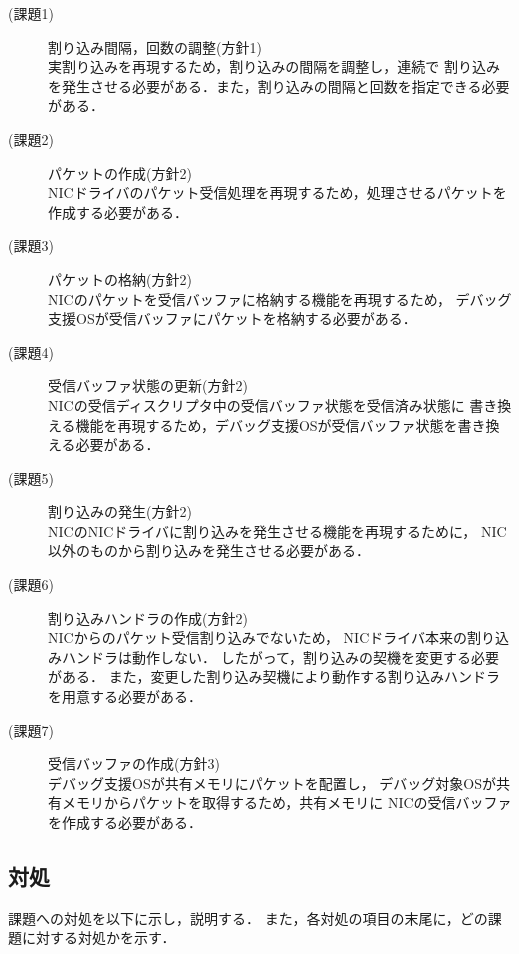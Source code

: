 \documentclass[submit,techreq,noauthor,dvipdfmx]{ipsj}
\begin{document}
\begin{description}
    \item[(課題1)] 割り込み間隔，回数の調整(方針1)\\
        実割り込みを再現するため，割り込みの間隔を調整し，連続で
        割り込みを発生させる必要がある．また，割り込みの間隔と回数を指定できる必要がある．
    \item[(課題2)] パケットの作成(方針2)\\
        NICドライバのパケット受信処理を再現するため，処理させるパケットを
        作成する必要がある．
    \item[(課題3)] パケットの格納(方針2)\\
        NICのパケットを受信バッファに格納する機能を再現するため，
        デバッグ支援OSが受信バッファにパケットを格納する必要がある．
    \item[(課題4)] 受信バッファ状態の更新(方針2)\\
        NICの受信ディスクリプタ中の受信バッファ状態を受信済み状態に
        書き換える機能を再現するため，デバッグ支援OSが受信バッファ状態を書き換える必要がある．
    \item[(課題5)] 割り込みの発生(方針2)\\
        NICのNICドライバに割り込みを発生させる機能を再現するために，
        NIC以外のものから割り込みを発生させる必要がある．
    \item[(課題6)] 割り込みハンドラの作成(方針2)\\
        NICからのパケット受信割り込みでないため，
        NICドライバ本来の割り込みハンドラは動作しない．
        したがって，割り込みの契機を変更する必要がある．
        また，変更した割り込み契機により動作する割り込みハンドラを用意する必要がある．
    \item[(課題7)] 受信バッファの作成(方針3)\\
        デバッグ支援OSが共有メモリにパケットを配置し，
        デバッグ対象OSが共有メモリからパケットを取得するため，共有メモリに
        NICの受信バッファを作成する必要がある．
\end{description}

\subsection{対処}\label{sec:deal}

課題への対処を以下に示し，説明する．
また，各対処の項目の末尾に，どの課題に対する対処かを示す．
\end{document}
